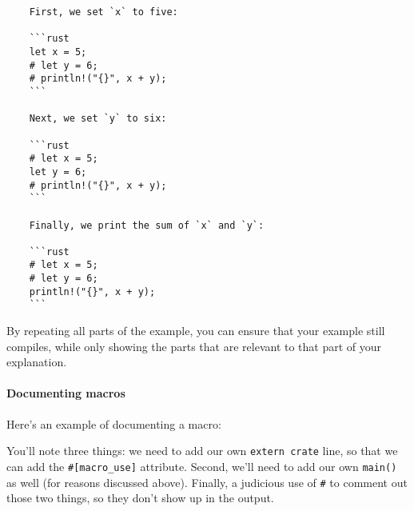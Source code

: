 \documentclass[a4paper,]{book}
\newenvironment{Shaded}{\begin{snugshade}}{\end{snugshade}}
\newcommand{\KeywordTok}[1]{\textcolor[rgb]{0.13,0.29,0.53}{\textbf{{#1}}}}
\newcommand{\CommentTok}[1]{\textcolor[rgb]{0.56,0.35,0.01}{\textit{{#1}}}}
\newcommand{\PreprocessorTok}[1]{\textcolor[rgb]{0.56,0.35,0.01}{\textit{{#1}}}}
\newcommand{\AttributeTok}[1]{\textcolor[rgb]{0.77,0.63,0.00}{{#1}}}
\newcommand{\NormalTok}[1]{{#1}}
\let\oldparagraph\paragraph
\renewcommand{\paragraph}[1]{\oldparagraph{#1}\mbox{}}
\begin{document}
\begin{verbatim}
    First, we set `x` to five:

    ```rust
    let x = 5;
    # let y = 6;
    # println!("{}", x + y);
    ```

    Next, we set `y` to six:

    ```rust
    # let x = 5;
    let y = 6;
    # println!("{}", x + y);
    ```

    Finally, we print the sum of `x` and `y`:

    ```rust
    # let x = 5;
    # let y = 6;
    println!("{}", x + y);
    ```
\end{verbatim}

By repeating all parts of the example, you can ensure that your example
still compiles, while only showing the parts that are relevant to that
part of your explanation.

\paragraph{Documenting macros}\label{documenting-macros}

Here's an example of documenting a macro:

\begin{Shaded}
\end{Shaded}

You'll note three things: we need to add our own \texttt{extern\ crate}
line, so that we can add the \texttt{\#{[}macro\_use{]}} attribute.
Second, we'll need to add our own \texttt{main()} as well (for reasons
discussed above). Finally, a judicious use of \texttt{\#} to comment out
those two things, so they don't show up in the output.
\end{document}
